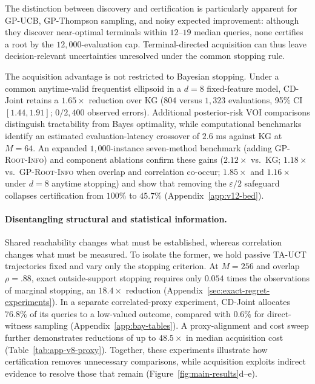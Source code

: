 \documentclass{article}
\theoremstyle{plain}
\theoremstyle{definition}
\begin{document}
The distinction between discovery and certification is particularly
apparent for GP-UCB, GP-Thompson sampling, and noisy expected improvement:
although they discover near-optimal terminals within $12$--$19$ median
queries, none certifies a root by the $12{,}000$-evaluation cap.
Terminal-directed acquisition can thus leave decision-relevant
uncertainties unresolved under the common stopping rule.

The acquisition advantage is not restricted to Bayesian stopping.
Under a common anytime-valid frequentist ellipsoid in a $d=8$
fixed-feature model, CD-Joint retains a $1.65\times$ reduction over KG
($804$ versus $1{,}323$ evaluations, 95\% CI $[1.44,1.91]$;
$0/2{,}400$ observed errors). Additional posterior-risk VOI comparisons
distinguish tractability from Bayes optimality, while computational
benchmarks identify an estimated evaluation-latency crossover of
$2.6$ ms against KG at $M=64$. An expanded $1{,}000$-instance
seven-method benchmark (adding \textsc{GP-Root-Info}) and component
ablations confirm these gains ($2.12\times$ vs.\ KG; $1.18\times$
vs.\ \textsc{GP-Root-Info} when overlap and correlation co-occur;
$1.85\times$ and $1.16\times$ under $d=8$ anytime stopping) and show
that removing the $\varepsilon/2$ safeguard collapses certification
from $100\%$ to $45.7\%$ (Appendix~\ref{app:v12-bed}).

\paragraph{Disentangling structural and statistical information.}
\label{sec:exp-overlap}\label{sec:exp-natural}
\label{sec:inside-witness-results}\label{sec:exp-computational}
Shared reachability changes what must be established, whereas
correlation changes what must be measured. To isolate the former,
we hold passive TA-UCT trajectories fixed and vary only the stopping
criterion. At $M=256$ and overlap $\rho=.88$, exact outside-support
stopping requires only $0.054$ times the observations of marginal
stopping, an $18.4\times$ reduction
(Appendix~\ref{sec:exact-regret-experiments}).
In a separate correlated-proxy experiment, CD-Joint allocates
$76.8\%$ of its queries to a low-valued outcome, compared with
$0.6\%$ for direct-witness sampling (Appendix~\ref{app:bay-tables}).
A proxy-alignment and cost sweep further demonstrates reductions
of up to $48.5\times$ in median acquisition cost
(Table~\ref{tab:app-v8-proxy}). Together, these experiments
illustrate how certification removes unnecessary comparisons,
while acquisition exploits indirect evidence to resolve those
that remain (Figure~\ref{fig:main-results}d--e).
\end{document}
